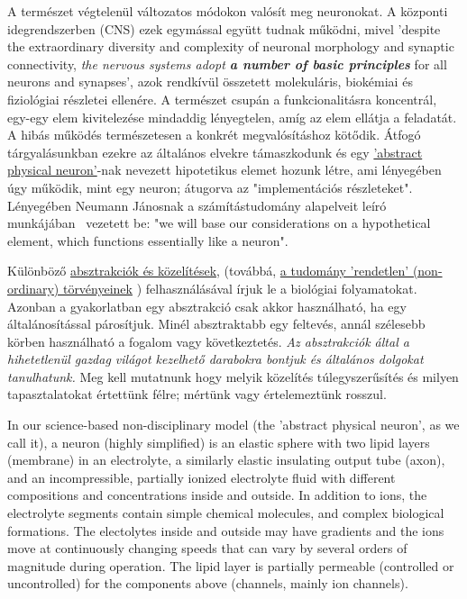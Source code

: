 \else

A természet végtelenül változatos módokon valósít meg neuronokat.
A központi idegrendszerben (\gls{CNS}) ezek egymással együtt tudnak működni, mivel 'despite the extraordinary diversity and complexity of neuronal morphology and synaptic connectivity,
\textit{the nervous systems adopt \textbf{a number of
 basic principles}} for all neurons and synapses',
\cite{JohnstonWuNeurophysiology:1995}
azok rendkívül összetett molekuláris, biokémiai és fiziológiai 
részletei ellenére.
A természet csupán a funkcionalitásra koncentrál, egy-egy elem  kivitelezése mindaddig lényegtelen, amíg az elem ellátja a feladatát. A hibás működés természetesen a konkrét megvalósításhoz kötődik.
Átfogó tárgyalásunkban ezekre az általános elvekre támaszkodunk
és egy \hyperlink{NeuronPhysical}
{'abstract physical neuron'}-nak nevezett hipotetikus elemet
hozunk létre, ami lényegében úgy működik, mint egy neuron;
átugorva az "implementációs részleteket".
Lényegében Neumann Jánosnak a számítástudomány alapelveit 
leíró munkájában~\cite{EDVACreport1945} vezetett be:
"we will base our considerations on a hypothetical element, which functions essentially like a neuron".

Különböző  \hyperlink{Abstractions}
{absztrakciók és közelítések},
(továbbá, \hyperlink{NonOrdinaryLaws}{a tudomány 'rendetlen' (non-ordinary) törvényeinek} ) felhasználásával  írjuk le a biológiai
folyamatokat.
Azonban a gyakorlatban egy absztrakció csak akkor használható,
ha egy általánosítással párosítjuk. Minél absztraktabb egy feltevés,
annál szélesebb körben használható a fogalom vagy következtetés.
\textit{Az absztrakciók által a hihetetlenül gazdag világot
kezelhető darabokra bontjuk és általános dolgokat tanul\-hatunk.}
Meg kell mutatnunk hogy melyik közelítés túlegyszerűsítés
és milyen tapasztalatokat értettünk félre; mértünk vagy értelemeztünk rosszul.
\fi


\ifx\magyar\undefined
In our  science-based non-disciplinary model (the 'abstract physical neuron', as we call it), a neuron (highly simplified) is an elastic sphere with two lipid layers (membrane) in an electrolyte, a similarly elastic insulating output tube (axon), and an incompressible, partially ionized electrolyte fluid with different compositions and concentrations inside and outside.
In addition to ions, the electrolyte segments contain simple chemical molecules, and complex biological formations.
The electolytes inside and outside  may have gradients and the ions move at continuously changing speeds that can vary by several orders of magnitude during operation. 
The lipid layer is partially permeable (controlled or uncontrolled) for the components above (channels, mainly ion channels).

